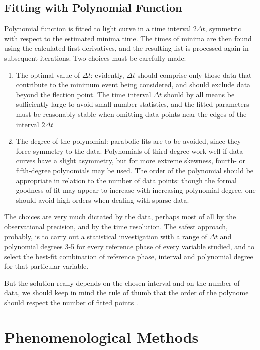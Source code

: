 \subsection{Fitting with Polynomial Function}
Polynomial function is fitted to light curve in a time interval $2 \Delta t$, symmetric with respect
to the estimated minima time. The times of minima are then found using 
the calculated first derivatives, and the resulting list is processed again in
subsequent iterations. Two choices must be carefully made:
\begin{enumerate}
\item The optimal value of $\Delta t$: evidently, $\Delta t$ should comprise only those data
that contribute to the minimum event being considered, and should exclude 
data beyond the flection point. The time interval $\Delta t$ should by all
means be sufficiently large to avoid small-number statistics, and the fitted
parameters must be reasonably stable when omitting data points near the
edges of the interval $2 \Delta t$
\item The degree of the polynomial: parabolic fits are to be avoided, since they
force symmetry to the data. Polynomials of third degree work well if data
curves have a slight asymmetry, but for more extreme skewness, fourth- or
fifth-degree polynomials may be used. The order of the polynomial should
be appropriate in relation to the number of data points: though the formal
goodness of fit may appear to increase with increasing polynomial degree,
one should avoid high orders when dealing with sparse data.
\end{enumerate}

The choices are very much dictated by the data, perhaps most of all by the
observational precision, and by the time resolution.
The safest approach, probably, is to carry out a statistical investigation with a range of $\Delta t$ and polynomial
degrees 3-5 for every reference phase of every variable studied, and to select the
best-fit combination of reference phase, interval and polynomial degree for that
particular variable.

But the solution really depends on the chosen interval
and on the number of data, we should keep in mind the rule of thumb that the order
of the polynome should respect the number of fitted points \citep{Sterken2005basic}.

\section{Phenomenological Methods}
\label{phenom}
 

